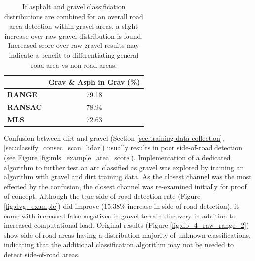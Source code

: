 \documentclass[numbered,pdftex]{ohio-etd}
\begin{document}
{{		\begin{table}[H]
			\centering
			\begin{tabular}{l|c}
									& Grav \& Asph in Grav (\%) \\
				\hline
				\textbf{RANGE}  	& 79.18       \\[-4pt]
				\textbf{RANSAC} 	& 78.94       \\[-4pt]
				\textbf{MLS}    	& 72.63      
			\end{tabular}
			\caption[Adjusted Averaged Gravel Area Score]{If asphalt and gravel classification distributions are combined for an overall road area detection within gravel areas, a slight increase over raw gravel distribution is found. Increased score over raw gravel results may indicate a benefit to differentiating general road area vs non-road areas.}
			\label{tab:adjusted_grav_avg_score}
		\end{table}

		{Confusion between dirt and gravel (Section \ref{sec:training-data-collection}, \ref{sec:classify_consec_scan_lidar}) usually results in poor side-of-road detection (see Figure \ref{fig:mls_example_area_score}). Implementation of a dedicated algorithm to further test an arc classified as gravel was explored by training an algorithm with gravel and dirt training data. As the closest channel was the most effected by the confusion, the closest channel was re-examined initially for proof of concept. Although the true side-of-road detection rate (Figure \ref{fig:dvg_example}) did improve (15.38\% increase in side-of-road detection), it came with increased false-negatives in gravel terrain discovery in addition to increased computational load. Original results (Figure \ref{fig:db_4_raw_range_2}) show side of road areas having a distribution majority of unknown classifications, indicating that the additional classification algorithm may not be needed to detect side-of-road areas.} 
		
}}
\end{document}

